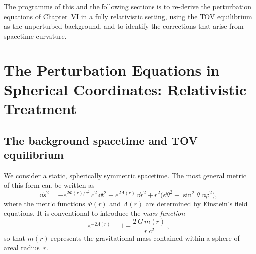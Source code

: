 \noindent
The programme of this and the following sections is to re-derive the
perturbation equations of Chapter~VI in a fully relativistic setting,
using the TOV equilibrium as the unperturbed background, and to
identify the corrections that arise from spacetime curvature.

\section{The Perturbation Equations in Spherical Coordinates:
  Relativistic Treatment}
\label{sec:rel-56}

\subsection{The background spacetime and TOV equilibrium}
\label{subsec:rel-56-tov}

We consider a static, spherically symmetric spacetime.  The most general
metric of this form can be written as
\begin{equation}
  \dd s^{2}
  = -e^{2\Phi(r)/c^{2}}\,c^{2}\,\dd t^{2}
    + e^{2\Lambda(r)}\,\dd r^{2}
    + r^{2}\bigl(\dd\theta^{2} + \sin^{2}\!\theta\;\dd\varphi^{2}\bigr),
  \label{eq:rel6-metric}
\end{equation}
where the metric functions $\Phi(r)$ and $\Lambda(r)$ are determined by
Einstein's field equations.  It is conventional to introduce the
\emph{mass function}
\begin{equation}
  e^{-2\Lambda(r)}
  = 1 - \frac{2\,G\,m(r)}{r\,c^{2}} \,,
  \label{eq:rel6-Lambda}
\end{equation}
so that $m(r)$ represents the gravitational mass contained within a sphere
of areal radius~$r$.

